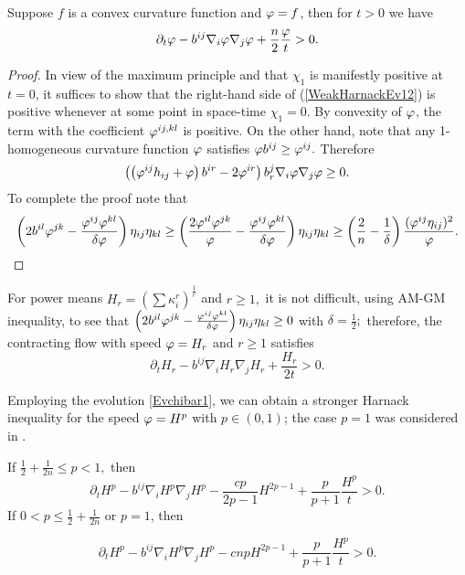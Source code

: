 \documentclass{amsart}
\begin{document}
\begin{theorem}\label{thm: main A}
Suppose $f$ is a  convex curvature function and $\varphi=f$, then for $t>0$ we have
$$\partial_t \varphi-b^{ij}\nabla_i\varphi\nabla_j\varphi+\frac{n}{2}\frac{\varphi}{t}>0.$$
\end{theorem}
\begin{proof}
In view of the maximum principle and that $\chi_1$ is manifestly positive at $t=0$, it suffices to show that the right-hand side of (\ref{WeakHarnackEv12}) is positive whenever at some point in space-time $\chi_1=0$. By convexity of $\varphi$, the term with the coefficient $\varphi^{ij,kl}$ is positive. On the other hand, note that any 1-homogeneous curvature function $\varphi$ satisfies $\varphi b^{ij}\geq \varphi^{ij}.$ Therefore
$$\left(\left(\varphi^{ij}h_{ij}+\varphi\right)b^{ir}-2\varphi^{ir}\right)b^{j}_{r}\nabla_{i}\varphi\nabla_{j}\varphi\ge 0.$$ To complete the proof note that
$$\left(2b^{il}\varphi^{jk}-\frac{\varphi^{ij}\varphi^{kl}}{\delta\varphi}\right)\eta_{ij}\eta_{kl}\geq \left(\frac{2\varphi^{il}\varphi^{jk}}{\varphi}-\frac{\varphi^{ij}\varphi^{kl}}{\delta\varphi}\right)\eta_{ij}\eta_{kl}\geq \left(\frac{2}{n}-\frac{1}{\delta}\right)\frac{(\varphi^{ij}\eta_{ij})^2}{\varphi}.$$
\end{proof}
\begin{remark}
For power means $H_r=\left(\sum \kappa_i^r\right)^{\frac{1}{r}}$ and $r\geq 1,$ it is not difficult, using AM-GM inequality, to see that $\left(2b^{il}\varphi^{jk}-\frac{\varphi^{ij}\varphi^{kl}}{\delta\varphi}\right)\eta_{ij}\eta_{kl}\geq0$ with $\delta=\frac{1}{2};$ therefore, the contracting flow with speed $\varphi=H_r$ and $r\geq 1$ satisfies
$$\partial_t H_r-b^{ij}\nabla_iH_r\nabla_jH_r+\frac{H_r}{2t}>0.$$
\end{remark}
Employing the evolution \cref{Evchibar1}, we can obtain a stronger Harnack inequality for the speed \(\varphi = H^{p}\) with \(p \in (0,1)\); the case $p=1$ was considered in \cite{2015arXiv150802821B}.
\begin{theorem}\label{thm: main 1}
If $\frac{1}{2}+\frac{1}{2n}\leq {p}< 1,$ then
\[
\partial_t H^{p} - b^{ij}\nabla_iH^{p}\nabla_jH^{p} - \frac{c {p}}{2{p}-1}H^{2{p}-1} + \frac{{p}}{{p}+1} \frac{H^{p}}{t} > 0.
\]
If $0<{p}\leq \frac{1}{2} + \frac{1}{2n}$ or $p=1$, then

\[
\partial_t H^{p} - b^{ij}\nabla_iH^{p}\nabla_jH^{p} - c n{p}H^{2{p}-1} + \frac{{p}}{{p}+1} \frac{H^{p}}{t} > 0.
\]
\end{theorem}
\end{document}
